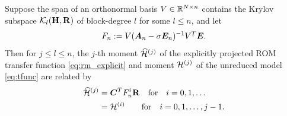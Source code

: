 \bigskip
\begin{theorem}
\label{thm:explicit_ROM_moment_matching}
Suppose the span of an orthonormal basis $V\in\mathbb{R}^{N\times n}$ contains the Krylov subspace $\mathcal{K}_{l}({\textbf{\textup{H}}},{\textbf{\textup{R}}})$ of block-degree $l$ for some $l\leq n$, and let 
\begin{equation}
F_n :=  V(\bm{A}_n-\sigma \bm{E}_n)^{-1}V^T \bm{E}.
\label{eq:F_n}
\end{equation}
Then for $j\leq l \leq n$, the $j$-th moment  $\widehat{\mathcal{H}}^{(j)}$ of the explicitly projected ROM transfer function \eqref{eq:rm_explicit} and moment $\mathcal{H}^{(j)}$ of the unreduced model \eqref{eq:tfunc} are related by
\begin{align}
\widehat{\mathcal{H}}^{(j)} &= \bm{C}^T F^i_n \textbf{\textup{R}} \quad \text{for}\quad i= 0,1,\ldots \label{eq:rmo_match} \\
		&= \mathcal{H}^{(i)} \qquad \text{for}\quad i =0,1,\ldots,j-1.     \label{eq:mo_match}
\end{align}
\end{theorem}

